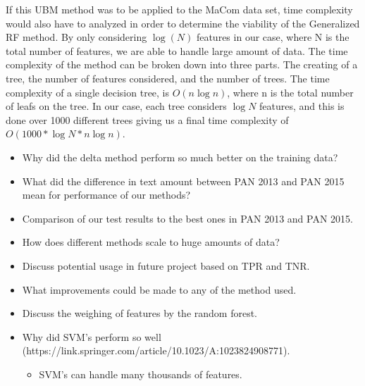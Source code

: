 If this \gls{UBM} method was to be applied to the MaCom data set, time complexity would
also have to analyzed in order to determine the viability of the Generalized RF 
method.
By only considering $\log(N)$ features in our case, 
where N is the total number of features, we are able to handle large amount of data. 
The time complexity of the method can be broken down into three parts.
The creating of a tree, the number of features considered, and the number of trees.
The time complexity of a single decision tree, is $O(n \log{n})$, where n is the
total number of leafs on the tree. In our case,
each tree considers $\log{N}$ features, and this is done over 1000 different
trees giving us a final time complexity of $O(1000 * \log{N} * n \log{n})$.\cite{RFTime}






\begin{itemize}
    \item Why did the delta method perform so much better on the training data?
    \item What did the difference in text amount between PAN 2013 and PAN 2015
        mean for performance of our methods?
    \item Comparison of our test results to the best ones in PAN 2013 and PAN
        2015.
    \item How does different methods scale to huge amounts of data?
    \item Discuss potential usage in future project based on TPR and TNR.
    \item What improvements could be made to any of the method used.
    \item Discuss the weighing of features by the random forest.
    \item Why did SVM's perform so well (https://link.springer.com/article/10.1023/A:1023824908771).
        \begin{itemize}
            \item SVM's can handle many thousands of features.
        \end{itemize}
\end{itemize}
